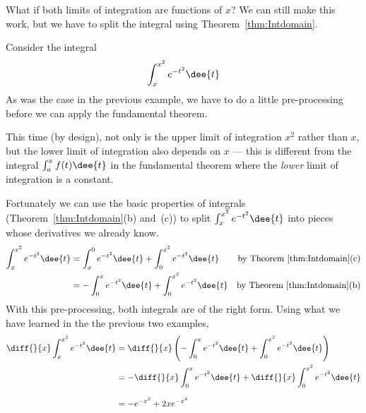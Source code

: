 What if both limits of integration are functions of $x$? We can still make this
work, but we have to split the integral using Theorem~\ref{thm:Intdomain}.
\begin{eg}\label{eg:INTftocC}
Consider the integral
\begin{align*}
  \int_x^{x^2} e^{-t^2}\dee{t}
\end{align*}
As was the case in the previous example, we have to do a little pre-processing
before we can apply the fundamental theorem.

This time (by design), not only is the upper limit of integration $x^2$ rather
than $x$, but the lower limit of integration also depends on $x$ --- this is
different from the integral $\int_a^x f(t)\dee{t}$ in the fundamental theorem
where the \emph{lower} limit of integration is a constant.

Fortunately we can use the basic properties of integrals
(Theorem~\ref{thm:Intdomain}(b) and~(c)) to split $\int_x^{x^2} e^{-t^2}\dee{t}$
into pieces whose derivatives we already know.
\begin{align*}
\int_x^{x^2} e^{-t^2}\dee{t}
&=\int_x^0 e^{-t^2}\dee{t}+\int_0^{x^2} e^{-t^2}\dee{t}
&\text{by Theorem~\ref{thm:Intdomain}(c)}\\
&=-\int^x_0 e^{-t^2}\dee{t}+\int_0^{x^2} e^{-t^2}\dee{t}
&\text{by Theorem~\ref{thm:Intdomain}(b)}
\end{align*}
With this pre-processing, both integrals are of the right form. Using what
we have learned in the the previous two examples,
\begin{align*}
\diff{}{x}\int_x^{x^2} e^{-t^2}\dee{t}
&=\diff{}{x}\left(
 -\int_0^{x} e^{-t^2}\dee{t} + \int_0^{x^2} e^{-t^2}\dee{t}
\right)\\
&=-\diff{}{x}\int^x_0 e^{-t^2}\dee{t}
+\diff{}{x}\int_0^{x^2} e^{-t^2}\dee{t}
\\[0.1in]
&=- e^{-x^2} +2x e^{-x^4}
\end{align*}
\end{eg}

